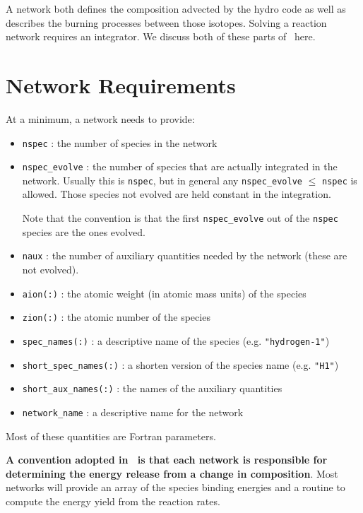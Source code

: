 
A network both defines the composition advected by the hydro code
as well as describes the burning processes between those isotopes.
Solving a reaction network requires an integrator.  We discuss
both of these parts of \microphysics\ here.

\section{Network Requirements}

At a minimum, a network needs to provide:
\begin{itemize}
 \item {\tt nspec} : the number of species in the network

 \item {\tt nspec\_evolve} : the number of species that are actually
   integrated in the network.  Usually this is {\tt nspec}, but in general
   any {\tt nspec\_evolve} $\le$ {\tt nspec} is allowed.  Those species
   not evolved are held constant in the integration.

   Note that the convention is that the first {\tt nspec\_evolve} out
   of the {\tt nspec} species are the ones evolved.

 \item {\tt naux} : the number of auxiliary quantities needed by the 
   network (these are not evolved).  

 \item {\tt aion(:)} : the atomic weight (in atomic mass units) of the
   species

 \item {\tt zion(:)} : the atomic number of the species

 \item {\tt spec\_names(:)} : a descriptive name of the species
   (e.g. {\tt "hydrogen-1"})

 \item {\tt short\_spec\_names(:)} : a shorten version of the species name
   (e.g. {\tt "H1"})

 \item {\tt short\_aux\_names(:)} : the names of the auxiliary quantities

 \item {\tt network\_name} : a descriptive name for the network

\end{itemize}
Most of these quantities are Fortran parameters.

{\bf A convention adopted in \microphysics\ is that each network
is responsible for determining the energy release from a change 
in composition}.  Most networks will provide an array of the species
binding energies and a routine to compute the energy yield from
the reaction rates.


